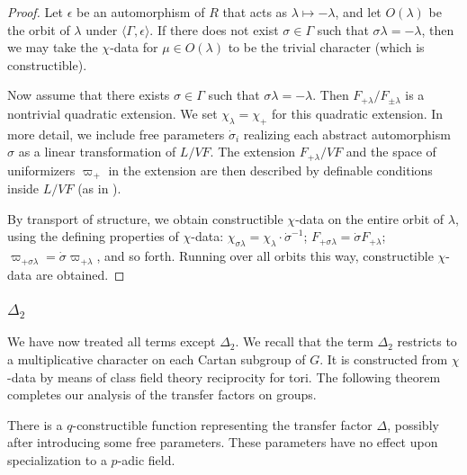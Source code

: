 \begin{proof}
Let $\epsilon$ be an automorphism of $R$ that acts as $\lambda\mapsto -\lambda$, and let $O(\lambda)$ be the orbit of $\lambda$ under $\langle\Gamma,\epsilon\rangle$.
If there does not exist $\sigma\in\Gamma$ such that $\sigma\lambda=-\lambda$, then we may take the $\chi$-data for $\mu\in O(\lambda)$ to be the trivial character
(which is constructible).   

Now assume that there exists $\sigma\in\Gamma$ such that $\sigma\lambda = -\lambda$.  Then $F_{+\lambda}/F_{\pm \lambda}$ is a nontrivial quadratic extension.
We set $\chi_\lambda = \chi_+$ for this quadratic extension.  
In more detail,
we include free parameters $\dot\sigma_i$ realizing each abstract automorphism $\sigma$ as a linear transformation of $L/VF$.
The extension $F_{+\lambda}/VF$ and the space of uniformizers $\varpi_+$ in the extension are then described by definable conditions inside $L/VF$ (as in \cite{cluckers2011transfer}).

By transport of structure, we obtain constructible $\chi$-data on the entire orbit of $\lambda$, using the defining properties of $\chi$-data:
$\chi_{\sigma\lambda} = \chi_{\lambda}\cdot \dot\sigma^{-1}$; $F_{+\sigma\lambda}=\dot\sigma F_{+\lambda}$; $\varpi_{+\sigma\lambda}=\dot\sigma\varpi_{+\lambda}$,
and so forth.   Running over all orbits this way, constructible $\chi$-data are obtained.
\end{proof}


\subsubsection{$\Delta_2$}

We have now treated all terms except $\Delta_2$.
We recall that the term $\Delta_2$ restricts to a multiplicative character on each Cartan subgroup of $G$.  It is constructed from $\chi$-data by
means of class field theory reciprocity for tori.  The following theorem completes our analysis of the transfer factors on groups.

\begin{theorem}\label{thm:delta2}  There is a $q$-constructible function representing the transfer factor $\Delta$, 
possibly after introducing some free parameters.  These parameters  have no effect upon specialization to a $p$-adic field.
\end{theorem}






